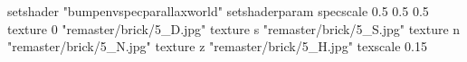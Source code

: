 setshader "bumpenvspecparallaxworld"
setshaderparam specscale 0.5 0.5 0.5
    texture 0 "remaster/brick/5_D.jpg"
    texture s "remaster/brick/5_S.jpg"
    texture n "remaster/brick/5_N.jpg"
    texture z "remaster/brick/5_H.jpg"
    texscale 0.15